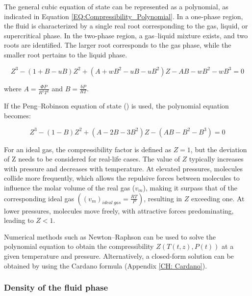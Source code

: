 \documentclass[a4paper,fleqn]{cas-dc}
\begin{document}
					The general cubic equation of state can be represented as a polynomial, as indicated in Equation \ref{EQ:Compressibility_Polynomial}. In a one-phase region, the fluid is characterized by a single real root corresponding to the gas, liquid, or supercritical phase. In the two-phase region, a gas--liquid mixture exists, and two roots are identified. The larger root corresponds to the gas phase, while the smaller root pertains to the liquid phase.
					
					{\footnotesize
						\begin{equation}
							\label{EQ:Compressibility_Polynomial}
							Z^3 - (1+B-uB)Z^2+(A+wB^2-uB-uB^2)Z - AB - wB^2 - wB^3 = 0
					\end{equation} }
					
					where $A=\frac{\Phi P}{R^2T^2}$ and $B=\frac{bP}{RT}$.
					
					If the Peng--Robinson equation of state (\citet{Peng1976}) is used, the polynomial equation becomes:
					
					{\footnotesize
						\begin{equation}
							\label{EQ:Peng_Robinson_Polynomial}
							Z^3 - (1-B)Z^2+(A-2B-3B^2)Z -(AB-B^2-B^3) = 0
					\end{equation} }
					
					For an ideal gas, the compressibility factor is defined as $Z = 1$, but the deviation of Z needs to be considered for real-life cases. The value of $Z$ typically increases with pressure and decreases with temperature. At elevated pressures, molecules collide more frequently, which allows the repulsive forces between molecules to influence the molar volume of the real gas ($v_m$), making it surpass that of the corresponding ideal gas $\left( \left(v_m\right)_{ideal~gas} = \frac{RT}{P} \right)$, resulting in $Z$ exceeding one. At lower pressures, molecules move freely, with attractive forces predominating, leading to $Z < 1$.
					
					Numerical methods such as Newton--Raphson can be used to solve the polynomial equation to obtain the compressibility $Z\left(T(t,z), P(t)\right)$ at a given temperature and pressure. Alternatively, a closed-form solution can be obtained by using the Cardano formula (Appendix \ref{CH: Cardano}).
					
					\subsubsection{Density of the fluid phase} \label{subsubsec: Fluid density}
					
\end{document}
